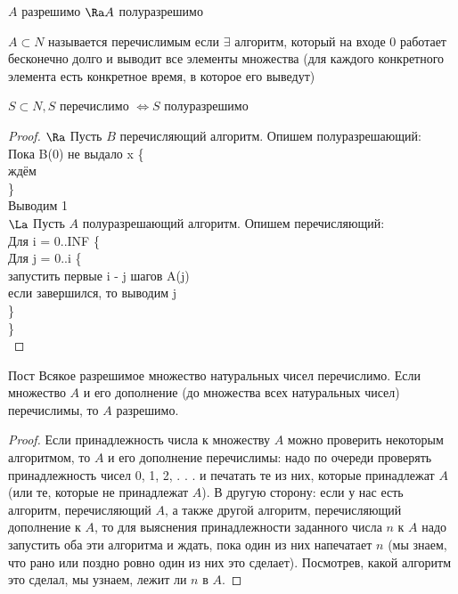 \begin{Rem}
	$A$ разрешимо $\Ra A$ полуразрешимо 
\end{Rem}
\begin{Def}
	$A \subset N$ называется перечислимым если $\exists$ алгоритм, который на входе $0$ работает бесконечно долго и выводит все элементы множества (для каждого конкретного элемента есть конкретное время, в которое его выведут)
\end{Def}

\begin{theorem}
	$S \subset N, S$ перечислимо $\Leftrightarrow S$ полуразрешимо 
\end{theorem}
\begin{proof}
	$\Ra$ Пусть $B$ перечисляющий алгоритм. Опишем полуразрешающий:\\
	Пока B(0) не выдало x \{\\
		ждём\\
	\}\\
	Выводим 1\\
	$\La$ Пусть $A$ полуразрешающий алгоритм. Опишем перечисляющий:\\
	Для i = 0..INF \{\\
		Для j = 0..i \{\\
			запустить первые i - j шагов A(j)\\
			если завершился, то выводим j\\
		\}\\
	\}\\
\end{proof}
\begin{theorem}{Пост}
	Всякое разрешимое множество натуральных чисел перечислимо. Если множество $A$ и его дополнение (до множества всех натуральных чисел) перечислимы, то $A$ разрешимо.
\end{theorem}
\begin{proof}
	Если принадлежность числа к множеству $A$ можно проверить некоторым алгоритмом, то $A$ и его дополнение перечислимы: надо по очереди проверять принадлежность чисел 0, 1, 2, . . . и печатать те из них, которые принадлежат $A$ (или те, которые не принадлежат $A$).
В другую сторону: если у нас есть алгоритм, перечисляющий $A$, а также другой алгоритм, перечисляющий дополнение к $A$, то для выяснения принадлежности заданного числа $n$ к $A$ надо запустить оба эти алгоритма и ждать, пока один из них напечатает $n$ (мы знаем, что рано или поздно ровно один из них это сделает). Посмотрев, какой алгоритм это сделал, мы узнаем, лежит ли $n$ в $A$. 
\end{proof}
